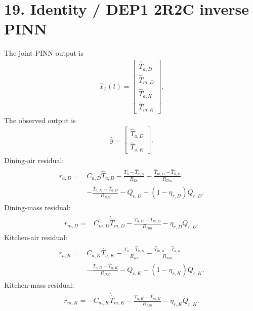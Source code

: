 \documentclass[11pt]{article}
\begin{document}
\section*{19. Identity / DEP1 2R2C inverse PINN}
The joint PINN output is
\begin{align}
\boxed{\widehat x_\phi(t)=\begin{bmatrix}\widehat T_{a,D}\\\widehat T_{m,D}\\\widehat T_{a,K}\\\widehat T_{m,K}\end{bmatrix}.}
\tag{P2.88}
\end{align}
The observed output is
\begin{align}
\boxed{\widehat y=\begin{bmatrix}\widehat T_{a,D}\\\widehat T_{a,K}\end{bmatrix}.}
\tag{P2.89}
\end{align}
Dining-air residual:
\begin{align}
\boxed{\begin{aligned}
r_{a,D}={}&C_{a,D}\dot{\widehat T}_{a,D}-\frac{T_o-\widehat T_{a,D}}{R_{Do}}-\frac{\widehat T_{m,D}-\widehat T_{a,D}}{R_{Dm}}\\
&-\frac{\widehat T_{a,K}-\widehat T_{a,D}}{R_{DK}}-Q_{c,D}-(1-\eta_{r,D})Q_{r,D}.
\end{aligned}}
\tag{P2.90}
\end{align}
Dining-mass residual:
\begin{align}
\boxed{\begin{aligned}
r_{m,D}={}&C_{m,D}\dot{\widehat T}_{m,D}-\frac{\widehat T_{a,D}-\widehat T_{m,D}}{R_{Dm}}-\eta_{r,D}Q_{r,D}.
\end{aligned}}
\tag{P2.91}
\end{align}
Kitchen-air residual:
\begin{align}
\boxed{\begin{aligned}
r_{a,K}={}&C_{a,K}\dot{\widehat T}_{a,K}-\frac{T_o-\widehat T_{a,K}}{R_{Ko}}-\frac{\widehat T_{m,K}-\widehat T_{a,K}}{R_{Km}}\\
&-\frac{\widehat T_{a,D}-\widehat T_{a,K}}{R_{DK}}-Q_{c,K}-(1-\eta_{r,K})Q_{r,K}.
\end{aligned}}
\tag{P2.92}
\end{align}
Kitchen-mass residual:
\begin{align}
\boxed{\begin{aligned}
r_{m,K}={}&C_{m,K}\dot{\widehat T}_{m,K}-\frac{\widehat T_{a,K}-\widehat T_{m,K}}{R_{Km}}-\eta_{r,K}Q_{r,K}.
\end{aligned}}
\tag{P2.93}
\end{align}
\end{document}
